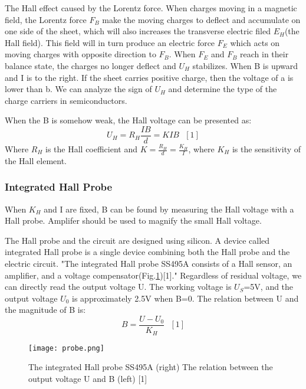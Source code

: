 \documentclass[12pt,a4paper]{article}
\begin{document}
The Hall effect caused by the Lorentz force. When charges moving in a magnetic field, the Lorentz force $F_B$ make the moving charges to deflect and accumulate on one side of the sheet, which will also increases the transverse electric filed $E_H$(the Hall field). This field will in turn produce an electric force $F_E$ which acts on moving charges with opposite direction to $F_B$. When $F_E$ and $F_B$ reach in their balance state, the charges no longer deflect and $U_H$ stabilizes. When B is upward and I is to the right. If the sheet carries positive charge, then the voltage of a is lower than b. We can analyze the sign of $U_H$ and determine the type of the charge carriers in semiconductors. \par
When the B is somehow weak, the Hall voltage can be presented as: 
\begin{equation}
    U_H=R_H\frac{IB}{d}=KIB~~~[1]
\end{equation}
Where $R_H$ is the Hall coefficient and $K=\frac{R_H}{d}=\frac{K_H}{I}$, where $K_H$ is the sensitivity of the Hall element.

\subsubsection{Integrated Hall Probe}
When $K_H$ and I are fixed, B can be found by measuring the Hall voltage with a Hall probe. Amplifer should be used to magnify the small Hall voltage.\par 
The Hall probe and the circuit are designed using silicon. A device called integrated Hall probe is a single device combining both the Hall probe and the electric circuit. "The integrated Hall probe SS495A consists of a Hall sensor, an amplifier, and a voltage compensator(Fig.\ref{probe})[1]." Regardless of residual voltage, we can directly read the output voltage U. The working voltage is $U_S$=5V, and the output voltage $U_0$ is approximately 2.5V when B=0. The relation between U and the magnitude of B is:
\begin{equation}
    B=\frac{U-U_0}{K_H}~~~[1]
\end{equation}

\begin{figure}
    \centering
    \texttt{[image: probe.png]}
    \caption{The integrated Hall probe SS495A (right) The relation between the output voltage U and B (left) [1]}
    \label{probe}
\end{figure}
\end{document}
